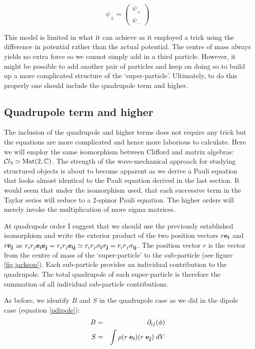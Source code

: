 \begin{equation}
\psi_\pm = 
\begin{pmatrix}
\psi_+\\
\psi_-
\end{pmatrix}
\end{equation}

\noindent This model is limited in what it can achieve as it employed a trick using the difference in potential rather than the actual potential. The centre of mass always yields no extra force so we cannot simply add in a third particle. However, it might be possible to add another pair of particles and keep on doing so to build up a more complicated structure of the `super-particle'. Ultimately, to do this properly one should include the quadrupole term and higher.

\subsection{Quadrupole term and higher}
The inclusion of the quadrupole and higher terms does not require any trick but the equations are more complicated and hence more laborious to calculate. Here we will employ the same isomorphism between Clifford and matrix algebras: $\mathcal{C}l_3 \simeq {\rm Mat}(2, {\mathbb C})$. The strength of the wave-mechanical approach for studying structured objects is about to become apparent as we derive a Pauli equation that looks almost identical to the Pauli equation derived in the last section. It would seem that under the isomorphism used, that each successive term in the Taylor series will reduce to a 2-spinor Pauli equation. The higher orders will merely invoke the multiplication of more sigma matrices.

At quadrupole order I suggest that we should use the previously established isomorphism and write the exterior product of the two position vectors $r {\bf e_i}$ and $r {\bf e_j}$ as $ r_i r_j {\bf e_i e_j} = r_i r_j {\bf e_{ij}} \simeq r_i r_j {\bf \sigma_i \sigma_j} =  r_i r_j{\bf \sigma_{ij}}$. The position vector $r$ is the vector from the centre of mass of the `super-particle' to the sub-particle (see figure \ref{fig.jackson}). Each sub-particle provides an individual contribution to the quadrupole. The total quadrupole of each super-particle is therefore the summation of all individual sub-particle contributions.

As before, we identify $B$ and $S$ in the quadrupole case as we did in the dipole case (equation \ref{pdipole}):
\begin{eqnarray}
B &=& \partial_{ij}(\phi) \\
S &=& \int \rho (r \;{\bf e_i})(r  \;{\bf e_j})\;dV
\end{eqnarray}

